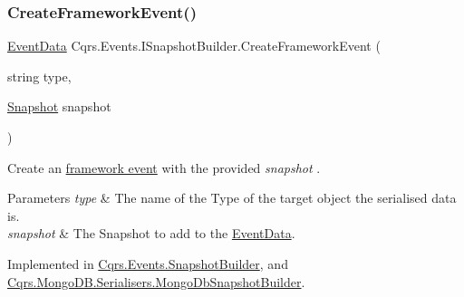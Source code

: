 \subsubsection{\texorpdfstring{Create\+Framework\+Event()}{CreateFrameworkEvent()}\hspace{0.1cm}{\footnotesize\ttfamily [2/2]}}
{\footnotesize\ttfamily \hyperlink{classCqrs_1_1Events_1_1EventData}{Event\+Data} Cqrs.\+Events.\+I\+Snapshot\+Builder.\+Create\+Framework\+Event (\begin{DoxyParamCaption}\item[{string}]{type,  }\item[{\hyperlink{classCqrs_1_1Snapshots_1_1Snapshot}{Snapshot}}]{snapshot }\end{DoxyParamCaption})}



Create an \hyperlink{}{framework event} with the provided {\itshape snapshot} . 


\begin{DoxyParams}{Parameters}
{\em type} & The name of the Type of the target object the serialised data is.\\
\hline
{\em snapshot} & The Snapshot to add to the \hyperlink{classCqrs_1_1Events_1_1EventData}{Event\+Data}.\\
\hline
\end{DoxyParams}


Implemented in \hyperlink{classCqrs_1_1Events_1_1SnapshotBuilder_a1329007abf3aa02e4cddbebc669e4209_a1329007abf3aa02e4cddbebc669e4209}{Cqrs.\+Events.\+Snapshot\+Builder}, and \hyperlink{classCqrs_1_1MongoDB_1_1Serialisers_1_1MongoDbSnapshotBuilder_ae05840d11ff5c3aa710b89bfbff1688b_ae05840d11ff5c3aa710b89bfbff1688b}{Cqrs.\+Mongo\+D\+B.\+Serialisers.\+Mongo\+Db\+Snapshot\+Builder}.


